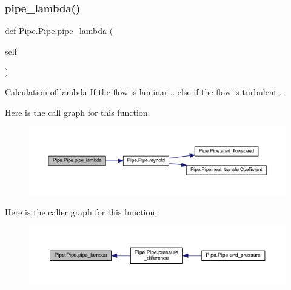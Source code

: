 \mbox{\label{class_pipe_1_1_pipe_aa09f88a2a098f433547773dcee75da6c}} 
\subsubsection{\texorpdfstring{pipe\+\_\+lambda()}{pipe\_lambda()}}
{\footnotesize\ttfamily def Pipe.\+Pipe.\+pipe\+\_\+lambda (\begin{DoxyParamCaption}\item[{}]{self }\end{DoxyParamCaption})}

\begin{DoxyVerb}Calculation of lambda
If the flow is laminar...
else if the flow is turbulent...
\end{DoxyVerb}
 Here is the call graph for this function\+:
\nopagebreak
\begin{figure}[H]
\begin{center}
\leavevmode
\includegraphics[width=350pt]{class_pipe_1_1_pipe_aa09f88a2a098f433547773dcee75da6c_cgraph}
\end{center}
\end{figure}
Here is the caller graph for this function\+:
\nopagebreak
\begin{figure}[H]
\begin{center}
\leavevmode
\includegraphics[width=350pt]{class_pipe_1_1_pipe_aa09f88a2a098f433547773dcee75da6c_icgraph}
\end{center}
\end{figure}
\mbox{\label{class_pipe_1_1_pipe_a69d6c5c5204633f84cc45801adf17aed}} 
